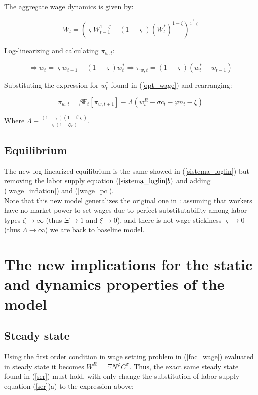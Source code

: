 \documentclass{article}
\newcommand{\Et}{\mathbb{E}_t}
\begin{document}
The aggregate wage dynamics is given by:

\begin{equation}
    W_t = \left(\varsigma W_{t-1}^{1-\zeta} + (1-\varsigma) (W_t^*)^{1-\zeta} \right)^{\frac{1}{1-\zeta}}
\end{equation}

Log-linearizing and calculating $\pi_{w,t}$:

\begin{equation}
    \Rightarrow w_t = \varsigma w_{t-1} + (1-\varsigma) w_t^* \Rightarrow \pi_{w,t} = (1-\varsigma)(w_t^* - w_{t-1})
\end{equation}

Substituting the expression for $w_t^*$ found in (\ref{opt_wage}) and rearranging:

\begin{equation}
    \label{wage_pc}
    \pi_{w,t} = \beta \Et[\pi_{w,t+1}] - \Lambda (w_t^R  - \sigma c_t - \varphi n_t - \xi)
\end{equation}

Where $\Lambda \equiv \frac{(1-\varsigma)(1- \beta \varsigma)}{\varsigma(1+ \zeta \varphi)}$.

\subsection{Equilibrium}
The new log-linearized equilibrium is the same showed in (\ref{sistema_loglin}) but removing the labor supply equation $(\ref{sistema_loglin}b)$ and adding (\ref{wage_inflation}) and (\ref{wage_pc}). \\

Note that this new model generalizes the original one in \cite{gali_monacelli}: assuming that workers have no market power to set wages due to perfect substitutability among labor types $\zeta \to \infty$ (thus $\Xi \to 1$ and $\xi \to 0$), and there is not wage stickiness $\varsigma \to 0$ (thus $\Lambda \to \infty$) we are back to baseline model.

\section{The new implications for the static and dynamics properties of the model}

\subsection{Steady state}
Using the first order condition in wage setting problem in (\ref{foc_wage}) evaluated in steady state it becomes $W^R = \Xi N^\varphi C^\sigma$. Thus, the exact same steady state found in (\ref{ser}) must hold, with only change the substitution of labor supply equation (\ref{ser})a) to the expression above:
\end{document}
